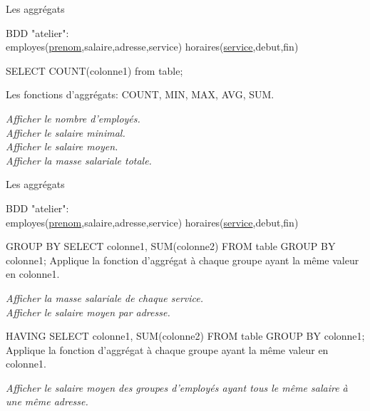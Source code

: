 \documentclass[xetex,dvipsnames]{beamer}
\begin{document}
\begin{frame}[t]{Les aggrégats}
\begin{small}
		BDD "atelier": \\employes(\underline{prenom},salaire,adresse,service) horaires(\underline{service},debut,fin)
\end{small}	
	\begin{alertblock}{}
	SELECT COUNT(colonne1) from table;
	\end{alertblock}
	\begin{block}{Les fonctions d'aggrégats:}
		COUNT, MIN, MAX, AVG, SUM.	
	\end{block}

	\textit{Afficher le nombre d'employés.}\\
	\textit{Afficher le salaire minimal.}\\
	\textit{Afficher le salaire moyen.}\\
	\textit{Afficher la masse salariale totale.}\\

\end{frame}

\begin{frame}[t]{Les aggrégats}
\begin{small}
		BDD "atelier": \\employes(\underline{prenom},salaire,adresse,service) horaires(\underline{service},debut,fin)
\end{small}	
	\begin{alertblock}{GROUP BY}
	SELECT colonne1, SUM(colonne2) FROM table GROUP BY colonne1;
	Applique la fonction d'aggrégat à chaque groupe ayant la même valeur en colonne1.
	\end{alertblock}
	\textit{Afficher la masse salariale de chaque service.}\\
	\textit{Afficher le salaire moyen par adresse.}\\
	
	\begin{alertblock}{HAVING}
	SELECT colonne1, SUM(colonne2) FROM table GROUP BY colonne1;
	Applique la fonction d'aggrégat à chaque groupe ayant la même valeur en colonne1.
	\end{alertblock}
	\textit{Afficher le salaire moyen des groupes d'employés ayant tous le même salaire à une même adresse.}\\
\end{frame}
\end{document}
